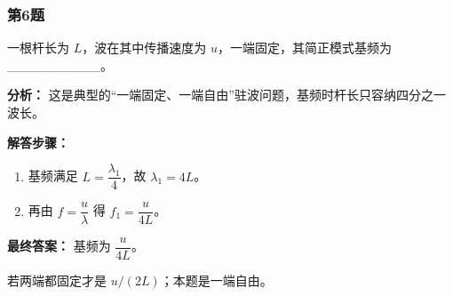 \documentclass[12pt,a4paper]{ctexart}
\begin{document}
\subsubsection*{第6题}
\begin{tcolorbox}[colback=gray!2!white,colframe=black!60,title={题目}]
一根杆长为 \(L\)，波在其中传播速度为 \(u\)，一端固定，其简正模式基频为\_\_\_\_\_\_\_\_\_\_。\par
\end{tcolorbox}
\begin{tcolorbox}[colback=blue!2!white,colframe=blue!55!black,title={完整答案}]
\textbf{分析：}
这是典型的“一端固定、一端自由”驻波问题，基频时杆长只容纳四分之一波长。\par
\textbf{解答步骤：}
\begin{enumerate}
\item 基频满足 \(L=\dfrac{\lambda_1}{4}\)，故 \(\lambda_1=4L\)。
\item 再由 \(f=\dfrac{u}{\lambda}\) 得 \(f_1=\dfrac{u}{4L}\)。
\end{enumerate}
\textbf{最终答案：}
基频为 \(\dfrac{u}{4L}\)。\par
\end{tcolorbox}
\begin{tcolorbox}[colback=red!2!white,colframe=red!55!black,title={易错点}]
若两端都固定才是 \(u/(2L)\)；本题是一端自由。\par
\end{tcolorbox}
\end{document}
